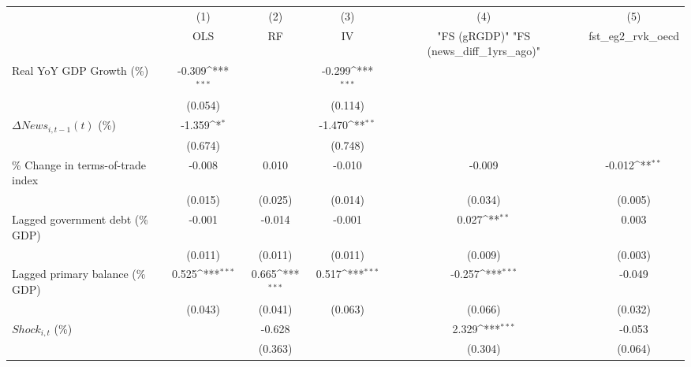 {
\def\sym#1{\ifmmode^{#1}\else\(^{#1}\)\fi}
\begin{tabular}{l*{5}{c}}
\toprule
                    &\multicolumn{1}{c}{(1)}&\multicolumn{1}{c}{(2)}&\multicolumn{1}{c}{(3)}&\multicolumn{1}{c}{(4)}&\multicolumn{1}{c}{(5)}\\
                    &\multicolumn{1}{c}{OLS}&\multicolumn{1}{c}{RF}&\multicolumn{1}{c}{IV}&\multicolumn{1}{c}{ "FS (gRGDP)"  "FS (news_diff_1yrs_ago)" }&\multicolumn{1}{c}{fst_eg2_rvk_oecd}\\
\midrule
Real YoY GDP Growth (\%)&      -0.309\sym{***}&                     &      -0.299\sym{***}&                     &                     \\
                    &     (0.054)         &                     &     (0.114)         &                     &                     \\
\addlinespace
$ \Delta News_{i,t-1}(t)$ (\%)&      -1.359\sym{*}  &                     &      -1.470\sym{**} &                     &                     \\
                    &     (0.674)         &                     &     (0.748)         &                     &                     \\
\addlinespace
\% Change in terms-of-trade index&      -0.008         &       0.010         &      -0.010         &      -0.009         &      -0.012\sym{**} \\
                    &     (0.015)         &     (0.025)         &     (0.014)         &     (0.034)         &     (0.005)         \\
\addlinespace
Lagged government debt (\% GDP)&      -0.001         &      -0.014         &      -0.001         &       0.027\sym{**} &       0.003         \\
                    &     (0.011)         &     (0.011)         &     (0.011)         &     (0.009)         &     (0.003)         \\
\addlinespace
Lagged primary balance (\% GDP)&       0.525\sym{***}&       0.665\sym{***}&       0.517\sym{***}&      -0.257\sym{***}&      -0.049         \\
                    &     (0.043)         &     (0.041)         &     (0.063)         &     (0.066)         &     (0.032)         \\
\addlinespace
$ Shock_{i,t}$ (\%) &                     &      -0.628         &                     &       2.329\sym{***}&      -0.053         \\
                    &                     &     (0.363)         &                     &     (0.304)         &     (0.064)         \\

\end{tabular}}
